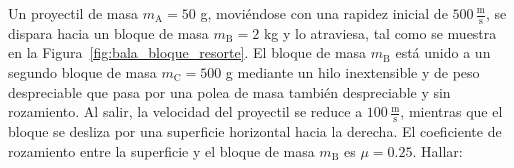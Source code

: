 \documentclass[addpoints]{exam}
\newcommand{\rta}{\textbf{Respuesta: }}
\begin{document}
\begin{questions}


    \question Un proyectil de masa $m_\text{A} = 50$ g, moviéndose con una rapidez inicial de $500 \, \frac{\text{m}}{\text{s}}$, se dispara hacia un bloque de masa $m_\text{B} = 2$ kg y lo atraviesa, tal como se muestra en la Figura~\ref{fig:bala_bloque_resorte}. El bloque de masa $m_\text{B}$ está unido a un segundo bloque de masa $m_\text{C} = 500$ g mediante un hilo inextensible y de peso despreciable que pasa por una polea de masa también despreciable y sin rozamiento. Al salir, la velocidad del proyectil se reduce a $100 \, \frac{\text{m}}{\text{s}}$, mientras que el bloque se desliza por una superficie horizontal hacia la derecha. El coeficiente de rozamiento entre la superficie y el bloque de masa $m_\text{B}$ es $\mu = 0.25$. Hallar:
\end{questions}
\end{document}
